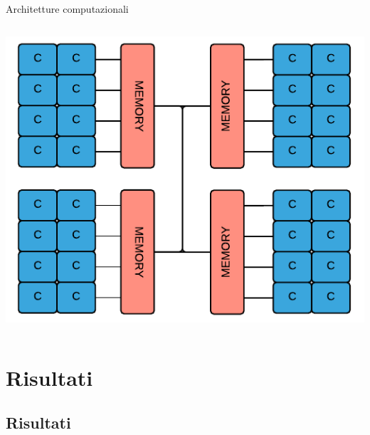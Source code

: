 \documentclass[8pt]{beamer}
\begin{document}
\begin{frame}{Architetture computazionali}
\begin{columns}
	\begin{center}
			\begin{center}
				\includegraphics[height=0.4\textheight]{beam_numa_schema.pdf}
			\end{center}
	\end{center}
	
\end{columns}

\end{frame}



\section{Risultati}
\subsection{Risultati}
\end{document}
